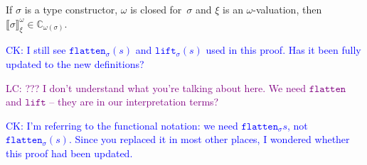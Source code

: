 \documentclass[runningheads,a4paper]{llncs}
\newcommand{\flatten}{\mathtt{flatten}}
\newcommand{\lift}{\mathtt{lift}}
\newcommand{\Cb}{\mathbb{C}}
\newcommand{\val}[3]{\ensuremath{\llbracket#1\rrbracket_{#2}^{#3}}}
\newcommand{\CK}[1]{\textcolor{blue}{CK: #1}}
\newcommand{\LC}[1]{\textcolor{purple}{LC: #1}}
\begin{document}
\begin{lemma}\label{lem_val_computable}
  If $\sigma$ is a type constructor, $\omega$ is closed for~$\sigma$
  and $\xi$ is an $\omega$-valuation, then $\val{\sigma}{\xi}{\omega}
  \in \Cb_{\omega(\sigma)}$.
\end{lemma}

\CK{I still see $\flatten_\sigma(s)$ and $\lift_\sigma(s)$ used in
this proof. Has it been fully updated to the new definitions?}

\LC{??? I don't understand what you're talking about here. We need
  $\flatten$ and $\lift$ -- they are in our interpretation terms?}

\CK{I'm referring to the functional notation: we need
$\flatten_\sigma s$, not $\flatten_\sigma(s)$.  Since you replaced
it in most other places, I wondered whether this proof had been
updated.}
\end{document}

